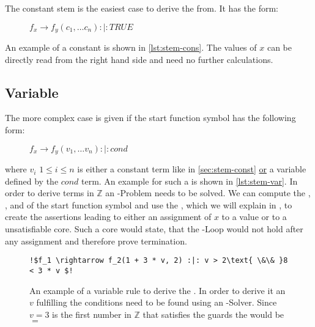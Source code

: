 The constant stem is the easiest case to derive the \stem from. It has the form: 
\begin{figure}[H]
	$f_x \rightarrow f_y(c_1,\dots c_n) :|: TRUE$
\end{figure} 
An example of a constant \stem is shown in \autoref{lst:stem-cons}. 
The values of $x$ can be directly read from the right hand side and need no further calculations.

\subsection{Variable \stem}
\label{sec:stem-var}
The more complex case is given if the start function symbol has the following form:
\begin{figure}[H]
	\hspace{2cm}
	$f_x \rightarrow f_y(v_1, \dots v_n) :|: cond$
\end{figure}
where $v_i$ $1 \le i \le n$ is either a constant term like in \autoref{sec:stem-const} \underline{or} a variable defined by the $cond$ term. An example for such a \stem is shown in \autoref{lst:stem-var}. In order to derive terms in $\mathbb{Z}$ an -Problem needs to be solved. We can compute the \guardmatrix, \guardconstants, \updatematrix and \updateconstants of the start function symbol and use the \smtfactory, which we will explain in %
, to create the assertions leading to either an assignment of $x$ to a value or to a unsatisfiable core. Such a core would state, that the -Loop would not hold after any assignment and therefore prove termination.

\newsavebox{\stemextwo}%
\newsavebox{\stemextwosecond}%
\begin{figure}[H]
	\begin{lstlisting}[escapechar=!]
	!$f_1 \rightarrow f_2(1 + 3 * v, 2) :|: v > 2\text{ \&\& }8 < 3 * v $!
	\end{lstlisting}	
	\caption{An example of a variable \its rule to derive the \stem. In order to derive it an $v$ fulfilling the conditions need to be found using an -Solver. Since $v=3$ is the first number in $\mathbb{Z}$ that satisfies the guards the \stem would be \usebox{\stemextwo}$=$\usebox{\stemextwosecond} }
	\label{lst:stem-var}
\end{figure}


